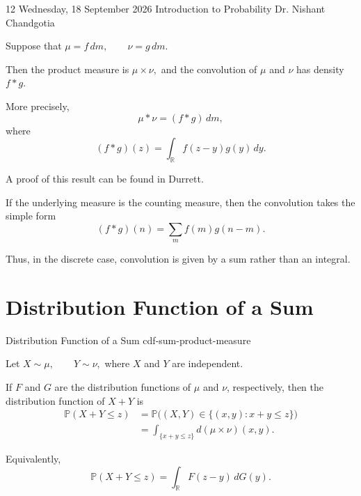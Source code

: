
\lecture
{12}
{Wednesday, 18 September 2026}
{Introduction to Probability}
{Dr. Nishant Chandgotia}



\begin{observation}

Suppose that
\(
\mu=f\,dm,
\qquad
\nu=g\,dm.
\)

Then the product measure is
\(
\mu\times\nu,
\)
and the convolution of $\mu$ and $\nu$ has density
\(
f*g.
\)

More precisely,
\[
\mu*\nu=(f*g)\,dm,
\]
where
\[
(f*g)(z)
=
\int_{\mathbb{R}}
f(z-y)g(y)\,dy.
\]

A proof of this result can be found in Durrett.

\end{observation}



\begin{observation}
If the underlying measure is the counting measure, then the
convolution takes the simple form
\[
(f*g)(n)
=
\sum_{m}f(m)g(n-m).
\]

Thus, in the discrete case, convolution is given by a sum rather
than an integral.

\end{observation}

\section{ Distribution Function of a Sum
}



\begin{theorem}{Distribution Function of a Sum}
{cdf-sum-product-measure}

Let
\(
X\sim\mu,
\qquad
Y\sim\nu,
\)
where $X$ and $Y$ are independent.

If $F$ and $G$ are the distribution functions of $\mu$ and $\nu$,
respectively, then the distribution function of $X+Y$ is
\[
\begin{aligned}
\mathbb{P}(X+Y\leq z)
&=
\mathbb{P}\bigl((X,Y)\in
\{(x,y):x+y\leq z\}\bigr)\\
&=
\int_{\{x+y\leq z\}}
d(\mu\times\nu)(x,y).
\end{aligned}
\]

Equivalently,
\[
\mathbb{P}(X+Y\leq z)
=
\int_{\mathbb{R}}F(z-y)\,dG(y).
\]

\end{theorem}

